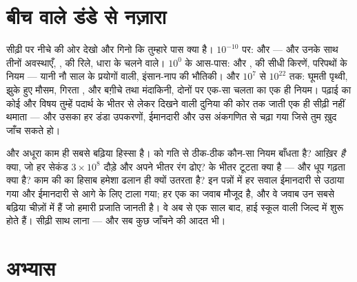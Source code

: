 \section{बीच वाले डंडे से नज़ारा}

\begin{remark}[नौ साल ने क्या खड़ा किया]\label{rem:g9:atoms-to-galaxies:built}
सीढ़ी पर नीचे की ओर देखो और गिनो कि तुम्हारे पास क्या है। $10^{-10}$
पर:  और  --- और उनके साथ तीनों अवस्थाएँ, ,  की
रिले, धारा के चलने वाले। $10^{0}$ के आस-पास:  और ,  की
सीधी किरणें, परिपथों के नियम --- यानी नौ साल के प्रयोगों वाली,
इंसान-नाप की भौतिकी। और $10^{7}$ से $10^{22}$ तक: घूमती पृथ्वी, झुके
हुए मौसम, गिरता , और बग़ीचे तथा मंदाकिनी, दोनों पर एक-सा चलता
 का एक ही नियम। पढ़ाई का कोई और विषय तुम्हें पदार्थ के
भीतर से लेकर दिखने वाली दुनिया की कोर तक जाती एक ही सीढ़ी नहीं थमाता
--- और उसका हर डंडा उपकरणों, ईमानदारी और उस अंकगणित से चढ़ा गया जिसे
तुम ख़ुद जाँच सकते हो।
\end{remark}

\begin{remark}[ऊपर क्या इंतज़ार कर रहा है]\label{rem:g9:atoms-to-galaxies:ahead}
और अधूरा काम ही सबसे बढ़िया हिस्सा है।  को गति से ठीक-ठीक कौन-सा
नियम बाँधता है?  आख़िर \emph{है} क्या, जो हर सेकंड $3 \times
10^{8}$  दौड़े और अपने भीतर रंग ढोए?  के भीतर टूटता क्या है
--- और धूप गढ़ता क्या है? काम की  का हिसाब हमेशा ढलान ही क्यों
उतरता है? इन पन्नों में हर सवाल ईमानदारी से उठाया गया और ईमानदारी से
आगे के लिए टाला गया; हर एक का जवाब मौजूद है, और वे जवाब उन सबसे बढ़िया
चीज़ों में हैं जो हमारी प्रजाति जानती है। वे अब से एक साल बाद, हाई
स्कूल वाली जिल्द में शुरू होते हैं। सीढ़ी साथ लाना --- और सब कुछ जाँचने
की आदत भी।
\end{remark}

\section{अभ्यास}

